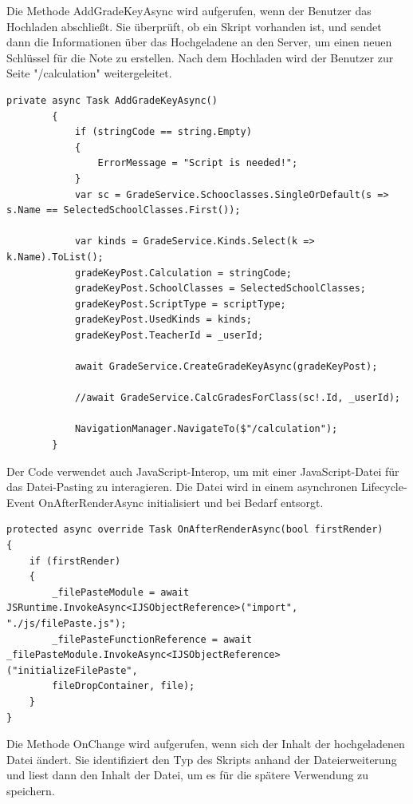 Die Methode AddGradeKeyAsync wird aufgerufen, wenn der Benutzer das Hochladen abschließt. Sie überprüft, ob ein Skript vorhanden ist, und sendet dann die Informationen über das Hochgeladene an den Server, um einen neuen Schlüssel für die Note zu erstellen. Nach dem Hochladen wird der Benutzer zur Seite "/calculation" weitergeleitet.

\begin{lstlisting}[language={[Sharp]C}, caption=Code for AddGradeKeyAsync, label=lst:imp:AddGradeKeyAsync]
    private async Task AddGradeKeyAsync()
        {
            if (stringCode == string.Empty)
            {
                ErrorMessage = "Script is needed!";
            }
            var sc = GradeService.Schooclasses.SingleOrDefault(s => s.Name == SelectedSchoolClasses.First());
    
            var kinds = GradeService.Kinds.Select(k => k.Name).ToList();
            gradeKeyPost.Calculation = stringCode;
            gradeKeyPost.SchoolClasses = SelectedSchoolClasses;
            gradeKeyPost.ScriptType = scriptType;
            gradeKeyPost.UsedKinds = kinds;
            gradeKeyPost.TeacherId = _userId;
            
            await GradeService.CreateGradeKeyAsync(gradeKeyPost);
    
            //await GradeService.CalcGradesForClass(sc!.Id, _userId);
    
            NavigationManager.NavigateTo($"/calculation");
        }
\end{lstlisting}
Der Code verwendet auch JavaScript-Interop, um mit einer JavaScript-Datei für das Datei-Pasting zu interagieren. Die Datei wird in einem asynchronen Lifecycle-Event OnAfterRenderAsync initialisiert und bei Bedarf entsorgt.

\begin{lstlisting}[language={[Sharp]C}, caption=Code for OnAfterRenderAsync, label=lst:imp:OnAfterRenderAsync]
protected async override Task OnAfterRenderAsync(bool firstRender)
{
    if (firstRender)
    {
        _filePasteModule = await JSRuntime.InvokeAsync<IJSObjectReference>("import", "./js/filePaste.js");
        _filePasteFunctionReference = await _filePasteModule.InvokeAsync<IJSObjectReference>("initializeFilePaste",
        fileDropContainer, file);
    }
}
\end{lstlisting}


Die Methode OnChange wird aufgerufen, wenn sich der Inhalt der hochgeladenen Datei ändert. Sie identifiziert den Typ des Skripts anhand der Dateierweiterung und liest dann den Inhalt der Datei, um es für die spätere Verwendung zu speichern.


